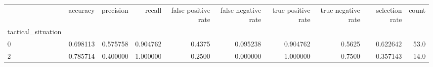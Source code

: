 \begin{tabular}{lrrrrrrrrr}
\toprule
{} &  accuracy &  precision &    recall &  false positive rate &  false negative rate &  true positive rate &  true negative rate &  selection rate &  count \\
tactical\_situation &           &            &           &                      &                      &                     &                     &                 &        \\
\midrule
0                  &  0.698113 &   0.575758 &  0.904762 &               0.4375 &             0.095238 &            0.904762 &              0.5625 &        0.622642 &   53.0 \\
2                  &  0.785714 &   0.400000 &  1.000000 &               0.2500 &             0.000000 &            1.000000 &              0.7500 &        0.357143 &   14.0 \\
\bottomrule
\end{tabular}
